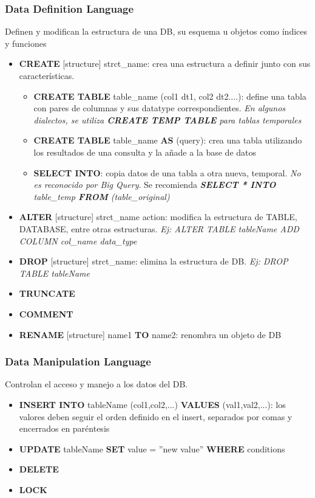 \subsubsection{Data Definition Language}
Definen y modifican la estructura de una DB, su esquema u objetos como índices y funciones
\begin{itemize}
    \item {\textbf{CREATE} [structure] strct\_name: crea una estructura a definir junto con sus características.
    \begin{itemize}
        \item {\textbf{CREATE TABLE} table\_name (col1 dt1, col2 dt2....): define una tabla con pares de columnas y sus \gls{datatype} correspondientes. \textit{En algunos dialectos, se utiliza \textbf{CREATE TEMP TABLE} para tablas temporales}}
        \item {\textbf{CREATE TABLE} table\_name \textbf{AS} (query): crea una tabla utilizando los resultados de una consulta y la añade a la base de datos}
        \item {\textbf{SELECT INTO}: copia datos de una tabla a otra nueva, temporal. \textit{No es reconocido por Big Query}. Se recomienda \textit{\textbf{SELECT * INTO} table\_temp \textbf{FROM} (table\_original)}}
    \end{itemize}}
    \item {\textbf{ALTER} [structure] strct\_name {action}: modifica la estructura de TABLE, DATABASE, entre otras estructuras. \textit{Ej: ALTER TABLE tableName ADD COLUMN col\_name data\_type}}
    \item {\textbf{DROP} [structure] strct\_name:  elimina la estructura de DB. \textit{Ej: DROP TABLE tableName}}
    \item {\textbf{TRUNCATE}}
    \item {\textbf{COMMENT}}
    \item {\textbf{RENAME} [structure] name1 \textbf{TO} name2: renombra un objeto de DB}
\end{itemize}

\subsubsection{Data Manipulation Language}
Controlan el acceso y manejo a los datos del DB.
\begin{itemize}
    \item {\textbf{INSERT INTO} tableName (col1,col2,...) \textbf{VALUES} (val1,val2,...): los valores deben seguir el orden definido en el insert, separados por comas y encerrados en paréntesis}
    \item {\textbf{UPDATE} tableName \textbf{SET} value = ''new value'' \textbf{WHERE} {conditions}}
    \item {\textbf{DELETE}}
    \item {\textbf{LOCK}}
\end{itemize}

